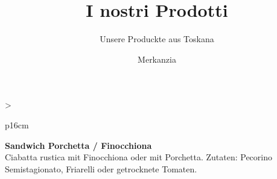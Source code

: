 \documentclass[
  beamerpaper,
  DIV=11,
  numbers=noendperiod,
  aspectratio=54]{scrreprt}
\title{I nostri Prodotti}
\subtitle{Unsere Produckte aus Toskana}
\author{Merkanzia}
\date{November 23, 2023\\
\strut \\
\strut \\
info@merkanzia.com}
\begin{document}
\maketitle
\ifdefined\Shaded\renewenvironment{Shaded}{\begin{tcolorbox}[enhanced, frame hidden, interior hidden, breakable, borderline west={3pt}{0pt}{shadecolor}, sharp corners, boxrule=0pt]}{\end{tcolorbox}}\fi

\begin{table}

\caption{\label{tbl-panel-panino}Panini Porchetta /
Finocchiona}\begin{minipage}[t]{\linewidth}

\tabularnewline

\fontsize{16}{18}\selectfont
\begin{tabular}{>{\raggedright\arraybackslash}p{16cm}}
\toprule
\begingroup\fontsize{18}{20}\selectfont \textbf{Sandwich Porchetta / Finocchiona}\endgroup\\
\midrule
Ciabatta rustica mit Finocchiona oder mit Porchetta. Zutaten: Pecorino Semistagionato, Friarelli oder getrocknete Tomaten.\\
\bottomrule
\end{tabular}

\end{minipage}%
\newline
\begin{minipage}[t]{\linewidth}


\end{minipage}%

\end{table}
\end{document}
